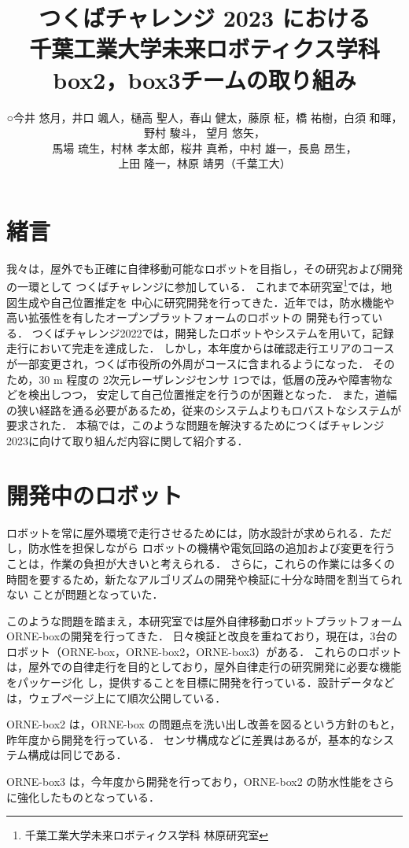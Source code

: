 \documentclass[twocolumn, 9pt]{jsproceedings}
\title{つくばチャレンジ 2023 における\\千葉工業大学未来ロボティクス学科 box2，box3チームの取り組み}
\author{○今井 悠月，井口 颯人，樋高 聖人，春山 健太，藤原 柾，\CID{8705}橋 祐樹，白須 和暉，野村 駿斗，
望月 悠矢，\\馬場 琉生，村林 孝太郎，桜井 真希，中村 雄一，長島 昂生，\\上田 隆一，林原 靖男（千葉工大）}
\affiliation{千葉工業大学未来ロボティクス学科 box2, box3チーム}
\begin{document}
\maketitle

\section{緒言}
我々は，屋外でも正確に自律移動可能なロボットを目指し，その研究および開発の一環として
つくばチャレンジに参加している．
これまで本研究室\footnote{千葉工業大学未来ロボティクス学科 林原研究室}では，地図生成や自己位置推定を
中心に研究開発を行ってきた．近年では，防水機能や高い拡張性を有したオープンプラットフォームのロボットの
開発も行っている．
つくばチャレンジ2022では，開発したロボットやシステムを用いて，記録走行において完走を達成した．
しかし，本年度からは確認走行エリアのコースが一部変更され，つくば市役所の外周がコースに含まれるようになった．
そのため，30 m 程度の 2次元レーザレンジセンサ 1つでは，低層の茂みや障害物などを検出しつつ，
安定して自己位置推定を行うのが困難となった．
また，道幅の狭い経路を通る必要があるため，従来のシステムよりもロバストなシステムが要求された．
本稿では，このような問題を解決するためにつくばチャレンジ2023に向けて取り組んだ内容に関して紹介する．

\section{開発中のロボット}
ロボットを常に屋外環境で走行させるためには，防水設計が求められる．ただし，防水性を担保しながら
ロボットの機構や電気回路の追加および変更を行うことは，作業の負担が大きいと考えられる．
さらに，これらの作業には多くの時間を要するため，新たなアルゴリズムの開発や検証に十分な時間を割当てられない
ことが問題となっていた．

このような問題を踏まえ，本研究室では屋外自律移動ロボットプラットフォーム ORNE-boxの開発を行ってきた\cite{box}．
日々検証と改良を重ねており，現在は，3台のロボット（ORNE-box，ORNE-box2，ORNE-box3）がある．
これらのロボットは，屋外での自律走行を目的としており，屋外自律走行の研究開発に必要な機能をパッケージ化
し，提供することを目標に開発を行っている．設計データなどは，ウェブページ上にて順次公開している．

ORNE-box2 は，ORNE-box の問題点を洗い出し改善を図るという方針のもと，昨年度から開発を行っている．
センサ構成などに差異はあるが，基本的なシステム構成は同じである．

ORNE-box3 は，今年度から開発を行っており，ORNE-box2 の防水性能をさらに強化したものとなっている．
\end{document}
